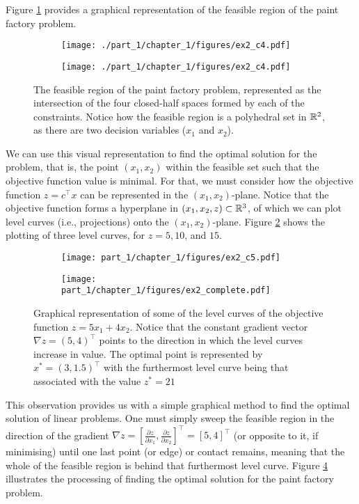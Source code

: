 Figure \ref{p1c1:fig:feasible_region_plot} provides a graphical representation of the feasible region of the paint factory problem. 
%
\begin{figure}[h]
	\begin{subfigure}{0.45\textwidth}
		\texttt{[image: ./part\_1/chapter\_1/figures/ex2\_c4.pdf]}	
		\caption{}
	\end{subfigure}
	\begin{subfigure}{0.45\textwidth}
		\texttt{[image: ./part\_1/chapter\_1/figures/ex2\_c4.pdf]}
		\caption{}		
	\end{subfigure}
	\caption{The feasible region of the paint factory problem, represented as the intersection of the four closed-half spaces formed by each of the constraints. Notice how the feasible region is a polyhedral set in $\mathbb{R}^2$, as there are two decision variables ($x_1$ and $x_2$).} \label{p1c1:fig:feasible_region_plot}	
\end{figure}
%

We can use this visual representation to find the optimal solution for the problem, that is, the point $(x_1,x_2)$ within the feasible set such that the objective function value is minimal. For that, we must consider how the objective function $z = c^\top x$ can be represented in the $(x_1, x_2)$-plane. Notice that the objective function forms a hyperplane in $(x_1, x_2, z) \subset \mathbb{R}^3$, of which we can plot level curves (i.e., projections) onto the $(x_1, x_2)$-plane. Figure \ref{p1c1:fig:level_curves_a} shows the plotting of three level curves, for $z= 5, 10$, and $15$. 
%
\begin{figure}
	\begin{subfigure}{0.45\textwidth}
		\texttt{[image: part\_1/chapter\_1/figures/ex2\_c5.pdf]}  
		\caption{} \label{p1c1:fig:level_curves_a}	
	\end{subfigure}
	\begin{subfigure}{0.45\textwidth}
		\texttt{[image: part\_1/chapter\_1/figures/ex2\_complete.pdf]}
		\caption{} \label{p1c1:fig:level_curves_b}	 
	\end{subfigure}
	\caption{Graphical representation of some of the level curves of the objective function $z = 5x_1 + 4x_2$. Notice that the constant gradient vector $\nabla z = (5,4)^\top$ points to the direction in which the level curves increase in value. The optimal point is represented by $x^*=(3, 1.5)^\top$ with the furthermost level curve being that associated with the value $z^* = 21$}	
\end{figure}
%
This observation provides us with a simple graphical method to find the optimal solution of linear problems. One must simply sweep the feasible region in the direction of the gradient $\nabla z=[\frac{\partial z}{\partial x_1},\frac{\partial z}{\partial x_2}]^\top=[5,4]^\top$ (or opposite to it, if minimising) until one last point (or edge) or contact remains, meaning that the whole of the feasible region is behind that furthermost level curve. Figure \ref{p1c1:fig:level_curves_b} illustrates the processing of finding the optimal solution for the paint factory problem.

